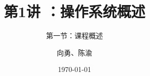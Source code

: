 

\title[第1讲]{第1讲 ：操作系统概述} %
\subtitle{第一节：课程概述}
\author{向勇、陈渝} %
\date{\today} %




\begin{frame}
\titlepage %
\end{frame}

%
%

